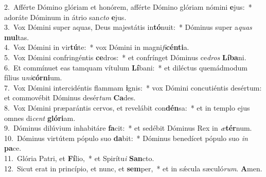 {2.~}Afférte Dómino glóriam et honórem, afférte Dómino glóriam nómini \textbf{e}jus:~* adoráte Dóminum in átrio san\textit{cto} \textbf{e}jus.\\
{3.~}Vox Dómini super aquas, Deus majestátis in\textbf{tó}nuit:~* Dóminus super a\textit{quas} \textbf{mul}tas.\\
{4.~}Vox Dómini in vir\textbf{tú}te:~* vox Dómini in magni\textit{fi}\textbf{cén}\textbf{ti}a.\\
{5.~}Vox Dómini confringéntis \textbf{ce}dros:~* et confrínget Dóminus ce\textit{dros} \textbf{Lí}\textbf{ba}ni.\\
{6.~}Et commínuet eas tamquam vítulum \textbf{Lí}bani:~* et diléctus quemádmodum fílius u\textit{ni}\textbf{cór}\textbf{ni}um.\\
{7.~}Vox Dómini intercidéntis flammam \textbf{i}gnis:~* vox Dómini concutiéntis desértum: et commovébit Dóminus desér\textit{tum} \textbf{Ca}des.\\
{8.~}Vox Dómini præparántis cervos, et revelábit con\textbf{dén}sa:~* et in templo ejus omnes di\textit{cent} \textbf{gló}\textbf{ri}am.\\
{9.~}Dóminus dilúvium inhabitáre \textbf{fa}cit:~* et sedébit Dóminus Rex in \textit{æ}\textbf{tér}num.\\
{10.~}Dóminus virtútem pópulo suo \textbf{da}bit:~* Dóminus benedícet pópulo suo \textit{in} \textbf{pa}ce.\\
{11.~}Glória Patri, et \textbf{Fí}lio,~* et Spirítu\textit{i} \textbf{San}cto.\\
{12.~}Sicut erat in princípio, et nunc, et \textbf{sem}per,~* et in sǽcula sæculó\textit{rum}. \textbf{A}men.\\

